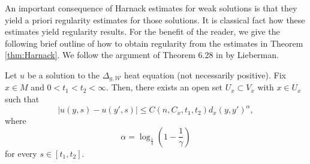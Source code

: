 \documentclass[a4paper, 12pt]{amsart}
\numberwithin{equation}{section}
\renewcommand{\~}{\tilde}
\renewcommand{\-}{\bar}
\newcommand{\8}{\infty}
\newcommand{\cW}{\mathcal{W}}
\newcommand{\cbrac}[1]{\left(#1\right)}
\newcommand{\modulus}[1]{|#1|}
\begin{document}
An important consequence of Harnack estimates for weak 
solutions is that they yield a priori regularity estimates
for those solutions. It is classical fact how these estimates
yield regularity results. For the benefit of the reader, 
we give the following brief outline of how to obtain
regularity from the estimates in Theorem \ref{thm:Harnack}.
We follow the argument of Theorem 6.28 in 
\cite{Lieberman} by Lieberman.

\begin{prop}
Let $u$ be a solution to the $\Delta_{g,\cW}$
heat equation (not necessarily positive).
Fix $x \in M$ and $0 < t_1 < t_2 < \infty$.
Then, there exists an open set $U_x \subset V_x$ 
with $x \in U_x$
such that 
$$ \modulus{u(y,s) - u(y',s)} \leq C(n, C_x, t_1, t_2) d_x(y, y')^\alpha,$$
where 
$$ \alpha = \log_{\frac{1}{4}}\cbrac{1 - \frac{1}{\gamma}}$$
for every $s \in [t_1, t_2]$.
\end{prop}
\end{document}
